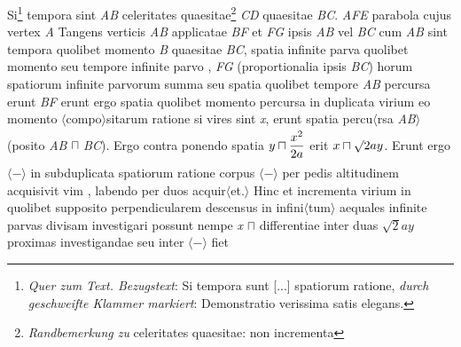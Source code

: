                      Si\footnote{\textit{Quer zum Text. Bezugstext}: Si tempora sunt [...] spatiorum ratione, \textit{durch geschweifte Klammer markiert}: Demonstratio verissima satis elegans.} tempora sint \textit{AB}  celeritates\protect{} quaesitae\footnote{\textit{Randbemerkung zu} celeritates quaesitae: non incrementa} \textit{CD}  quaesitae \textit{BC}.  \textit{AFE} parabola cujus vertex \textit{A} Tangens verticis \textit{AB}  applicatae \textit{BF} et \textit{FG} ipsis \textit{AB} vel \textit{BC}  cum \textit{AB} sint tempora  quolibet momento \textit{B} quaesitae \textit{BC}, spatia infinite parva quolibet momento seu tempore infinite parvo , \textit{FG} (proportionalia ipsis \textit{BC}) horum spatiorum infinite parvorum summa seu spatia quolibet tempore \textit{AB} percursa erunt \textit{BF} erunt ergo spatia quolibet momento percursa in duplicata virium eo momento $\langle$compo$\rangle$sitarum ratione si vires sint \textit{x}, erunt spatia percu$\langle$rsa \textit{AB}$\rangle$ (posito \textit{AB} $\sqcap$ \textit{BC}). Ergo contra ponendo spatia $\displaystyle y \sqcap \frac{x^2}{2a}\rule[-4mm]{0mm}{10mm}$ erit $x \sqcap \surd 2ay \rule[-4mm]{0mm}{10mm}$.
                      Erunt ergo $\langle$−$\rangle$ in subduplicata spatiorum ratione corpus $\langle$−$\rangle$ per pedis altitudinem acquisivit vim , labendo per duos acquir$\langle$et.$\rangle$ Hinc et incrementa virium\protect{} in quolibet  supposito perpendicularem descensus in infini$\langle$tum$\rangle$ aequales infinite parvas divisam investigari possunt nempe \textit{x} $\sqcap$ differentiae inter duas $\surd 2ay$ proximas investigandae seu inter $\langle$−$\rangle$ fiet 
